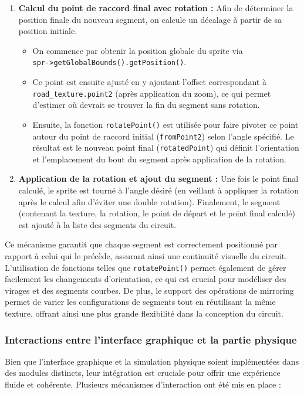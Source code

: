 \begin{enumerate}
    \item \textbf{Calcul du point de raccord final avec rotation :}
    Afin de déterminer la position finale du nouveau segment, on calcule un décalage à partir de sa position initiale.
    \begin{itemize}
        \item On commence par obtenir la position globale du \gls{sprite} via \\\texttt{spr->getGlobalBounds().getPosition()}.
        \item Ce point est ensuite ajusté en y ajoutant l'offset correspondant à \\\texttt{road\_texture.point2} (après application du zoom), ce qui permet d'estimer où devrait se trouver la fin du segment sans rotation.
        \item Ensuite, la fonction \texttt{rotatePoint()} est utilisée pour faire pivoter ce point autour du point de raccord initial (\texttt{fromPoint2}) selon l'angle spécifié.
        Le résultat est le nouveau point final (\texttt{rotatedPoint}) qui définit l'orientation et l'emplacement du bout du segment après application de la rotation.
    \end{itemize}

    \item \textbf{Application de la rotation et ajout du segment :}
    Une fois le point final calculé, le \gls{sprite} est tourné à l’angle désiré (en veillant à appliquer la rotation après le calcul afin d’éviter une double rotation).
    Finalement, le segment (contenant la texture, la rotation, le point de départ et le point final calculé) est ajouté à la liste des segments du circuit.
\end{enumerate}

Ce mécanisme garantit que chaque segment est correctement positionné par rapport à celui qui le précède, assurant ainsi une continuité visuelle du circuit.
L'utilisation de fonctions telles que \texttt{rotatePoint()} permet également de gérer facilement les changements d'orientation, ce qui est crucial pour modéliser des virages et des segments courbes.
De plus, le support des opérations de mirroring permet de varier les configurations de segments tout en réutilisant la même texture, offrant ainsi une plus grande flexibilité dans la conception du circuit.


\subsubsection{Interactions entre l'interface graphique et la partie physique}\label{subsubsec:interactions-entre-l-interface-graphique-et-la-partie-physique}
Bien que l'interface graphique et la simulation physique soient implémentées dans des modules distincts, leur intégration est cruciale pour offrir une expérience fluide et cohérente.
Plusieurs mécanismes d'interaction ont été mis en place :


